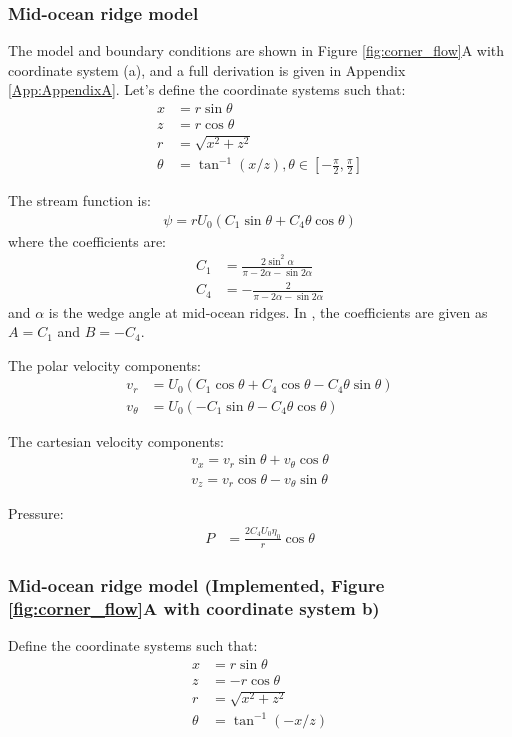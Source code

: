 \documentclass[a4paper,11pt]{article}
\begin{document}
\subsubsection{Mid-ocean ridge model \citep{Spiegelman1987}}
The model and boundary conditions are shown in Figure \ref{fig:corner_flow}A with coordinate system (a), and a full derivation is given in Appendix \ref{App:AppendixA}. Let's define the coordinate systems such that:
\begin{align}
x &= r\sin\theta \\
z &= r\cos\theta \\
r &= \sqrt{x^2+z^2}\\
\theta &= \tan^{-1}({x/z}), \theta\in\left[-\frac{\pi}{2},\frac{\pi}{2}\right]
\end{align}

The stream function is:
\begin{align}
\psi = r U_0 (C_1\sin\theta+C_4\theta\cos\theta)
\end{align}
where the coefficients are:
\begin{align}
C_1 &= \frac{\displaystyle 2\sin^2\alpha}{\displaystyle \pi-2\alpha-\sin2\alpha} \\
C_4 &= -\frac{\displaystyle 2}{\displaystyle \pi-2\alpha-\sin2\alpha} 
\end{align}
and $\alpha$ is the wedge angle at mid-ocean ridges. In \citet{Spiegelman1987}, the coefficients are given as $A=C_1$ and $B=-C_4$.

The polar velocity components:
\begin{align}
 v_r&= U_0(C_1\cos\theta+C_4\cos\theta-C_4\theta\sin\theta) \label{eq:vr}\\
v_\theta&= U_0(-C_1\sin\theta-C_4\theta\cos\theta)\label{eq:vtheta}
 \end{align}
 
The cartesian velocity components:
\begin{align}
v_x = v_r\sin\theta + v_\theta\cos\theta\\
v_z = v_r\cos\theta - v_\theta\sin\theta
\end{align}

Pressure:
\begin{align}
P &= \frac{2C_4 U_0 \eta_0}{r}\cos\theta
\end{align}

\subsubsection{Mid-ocean ridge model (Implemented, Figure \ref{fig:corner_flow}A with coordinate system b)}\label{moranalytic}
Define the coordinate systems such that:
\begin{align}
x &= r\sin\theta \\
z &= -r\cos\theta \\
r &= \sqrt{x^2+z^2}\\
\theta &= \tan^{-1}({-x/z})
\end{align}
 
\end{document}
